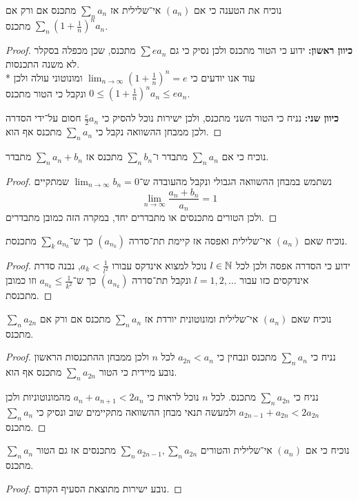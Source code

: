 \Subquestion{}
נוכיח את הטענה כי אם $(a_n)$ אי־שלילית אז $\sum_n a_n$ מתכנס אם ורק אם $\sum_n {(1 + \frac{1}{n})}^n a_n$ מתכנס.
\begin{proof}
	\textbf{כיוון ראשון:}
	ידוע כי הטור מתכנס ולכן נסיק כי גם $\sum e a_n$ מתכנס, שכן מכפלה בסקלר לא משנה התכנסות. \\*
	עוד אנו יודעים כי $\lim_{n \to \infty} {(1 + \frac{1}{n})}^n = e$ ומונוטוני עולה ולכן $0 \le {(1 + \frac{1}{n})}^n a_n \le e a_n$ ונקבל כי הטור מתכנס.

	\textbf{כיוון שני:}
	נניח כי הטור השני מתכנס, ולכן ישירות נוכל להסיק כי $\frac{e}{2} a_n$ חסום על־ידי הסדרה ולכן ממבחן ההשוואה נקבל כי $\sum_n a_n$ מתכנס אף הוא.
\end{proof}

\Subquestion{}
נוכיח כי אם $\sum_n a_n$ מתבדר ו־$\sum_n b_n$ מתכנס אז $\sum_n a_n + b_n$ מתבדר.
\begin{proof}
	נשתמש במבחן ההשוואה הגבולי ונקבל מהעובדה ש־$\lim_{n \to \infty} b_n = 0$ שמתקיים
	\[
		\lim_{n \to \infty} \frac{a_n + b_n}{a_n} = 1
	\]
	ולכן הטורים מתכנסים או מתבדרים יחד, במקרה הזה כמובן מתבדרים.
\end{proof}

\Subquestion{}
נוכיח שאם $(a_n)$ אי־שלילית ואפסה אז קיימת תת־סדרה $(a_{n_k})$ כך ש־$\sum_k a_{n_k}$ מתכנסת.
\begin{proof}
ידוע כי הסדרה אפסה ולכן לכל $l \in \mathbb{N}$ נוכל למצוא אינדקס עבורו $a_k < \frac{1}{l^2}$, נבנה סדרת אינדקסים כזו עבור $l = 1, 2, \dots$ ונקבל תת־סדרה $(a_{n_k})$ כך ש־$a_{n_k} \le \frac{1}{k^2}$ וזו כמובן מתכנסת.
\end{proof}

\Subquestion{}
נוכיח שאם $(a_n)$ אי־שלילית ומונוטונית יורדת אז $\sum_n a_n$ מתכנס אם ורק אם $\sum_n a_{2n}$ מתכנס.
\begin{proof}
	נניח כי $\sum_n a_n$ מתכנס ונבחין כי $a_{2n} < a_n$ לכל $n$ ולכן ממבחן ההתכנסות הראשון נובע מיידית כי הטור $\sum_n a_{2n}$ מתכנס אף הוא.

	נניח כי $\sum_n a_{2n}$ מתכנס. לכל $n$ נוכל לראות כי $a_n + a_{n + 1} < 2 a_n$ מהמונוטוניות ולכן $a_{2n - 1} + a_{2n} < 2 a_{2n}$ ולמעשה תנאי מבחן ההשוואה מתקיימים שוב ונסיק כי $\sum_n a_n$ מתכנס.
\end{proof}

\Subquestion{}
נוכיח כי אם $(a_n)$ אי־שלילית והטורים $\sum_n a_{2n - 1}, \sum_n a_{2n}$ מתכנסים אז גם הטור $\sum_n a_n$ מתכנס.
\begin{proof}
	נובע ישירות מתוצאת הסעיף הקודם.
\end{proof}

